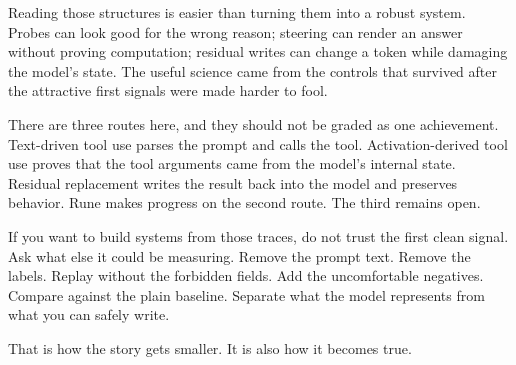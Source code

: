 \documentclass[acmsmall,screen,nonacm]{acmart}
\begin{document}
Reading those structures is easier than turning them into a robust system.
Probes can look good for the wrong reason; steering can render an answer without
proving computation; residual writes can change a token while damaging the
model's state. The useful science came from the controls that survived after
the attractive first signals were made harder to fool.

There are three routes here, and they should not be graded as one achievement.
Text-driven tool use parses the prompt and calls the tool. Activation-derived
tool use proves that the tool arguments came from the model's internal state.
Residual replacement writes the result back into the model and preserves
behavior. Rune makes progress on the second route. The third remains open.

If you want to build systems from those traces, do not trust the first clean
signal. Ask what else it could be measuring. Remove the prompt text. Remove the
labels. Replay without the forbidden fields. Add the uncomfortable negatives.
Compare against the plain baseline. Separate what the model represents from what
you can safely write.

That is how the story gets smaller. It is also how it becomes true.



\end{document}
